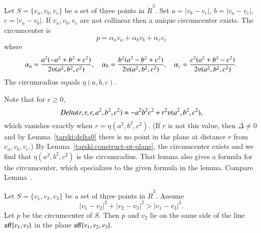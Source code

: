 \begin{tarskidata}
\begin{tarski}

\begin{lemma}
Let $S= \{v_a,v_b,v_c\}$ be a set of three points in $\ring{R}^3$.
Set $a = |v_b
- v_c|$, $b = |v_a - v_c|$, $c = |v_a  - v_b |$.  If $v_a,v_b,v_c$
are not collinear then a unique circumcenter exists.  The circumcenter is
    $$p = \alpha_a v_a + \alpha_b v_b + \alpha_c v_c$$
where
    $$%
    \alpha_a = \frac{a^2(- a^2 + b^2 + c^2)}{2\ups(a^2,b^2,c^2)},\quad
    \alpha_b = \frac{b^2(a^2 - b^2 + c^2)}{2\ups(a^2,b^2,c^2)},\quad
    \alpha_c = \frac{c^2(a^2 + b^2 - c^2)}{2\ups(a^2,b^2,c^2)}.
    $$
The circumradius equals $\eta(a,b,c)$.
\end{lemma}


\begin{proved} Note that for $r\ge 0$,
$$\Delta(r,r,r,a^2,b^2,c^2) = -a^2 b^2 c^2 + r^2\ups(a^2,b^2,c^2),$$
which vanishes exactly when $r = \eta(a^2,b^2,c^2)$.  (If $r$ is not this value, 
then $\Delta\ne0$ and by Lemma~\ref{tarski:delta0} there is no point in the plane at distance
$r$ from $v_a,v_b,v_c$.)  By Lemma~\ref{tarski:construct-pt-plane}, the circumcenter exists and
we find that $\eta(a^2,b^2,c^2)$ is the circumradius.  That lemma also gives a formula
for the circumcenter, which specializes to the given formula in the lemma.
Compare
Lemma~.
\swallowed\end{proved}
\end{tarski}




\begin{tarski}

\begin{lemma}
Let  $S=\{v_1,v_2,v_3\}$ be a set of three points
in $\ring{R}^3$. Assume 
   $$
   |v_1-v_2|^2 + |v_2-v_3|^2 > |v_1-v_3|^2.
   $$
Let $p$ be the circumcenter of $S$.
Then $p$ and $v_2$ lie on the same side of the line ${\operatorname{aff}}\{v_1,v_3\}$
in the plane ${\operatorname{aff}}\{v_1,v_2,v_3\}$.
\end{lemma}


\end{tarski}
\end{tarskidata}
